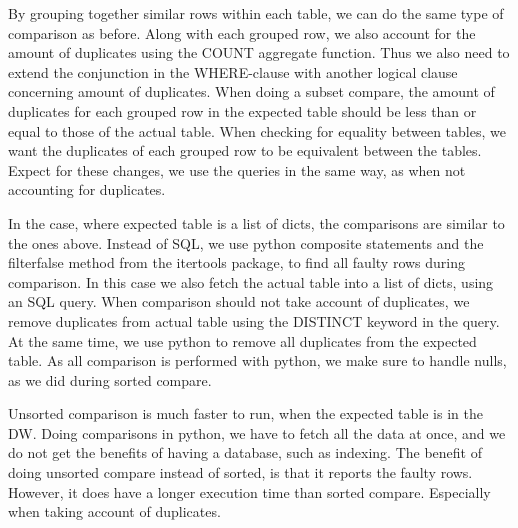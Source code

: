 
By grouping together similar rows within each table, we can do the same type of comparison as before. Along with each grouped row, we also account for the amount of duplicates using the COUNT aggregate function. Thus we also need to extend the conjunction in the WHERE-clause with another logical clause concerning amount of duplicates. When doing a subset compare, the amount of duplicates for each grouped row in the expected table should be less than or equal to those of the actual table. When checking for equality between tables, we want the duplicates of each grouped row to be equivalent between the tables. Expect for these changes, we use the queries in the same way, as when not accounting for duplicates.

In the case, where expected table is a list of dicts, the comparisons are similar to the ones above. Instead of SQL, we use python composite statements and the filterfalse method from the itertools package, to find all faulty rows during comparison. In this case we also fetch the actual table into a list of dicts, using an SQL query. When comparison should not take account of duplicates, we remove duplicates from actual table using the DISTINCT keyword in the query. At the same time, we use python to remove all duplicates from the expected table. As all comparison is performed with python, we make sure to handle nulls, as we did during sorted compare.

Unsorted comparison is much faster to run, when the expected table is in the DW. Doing comparisons in python, we have to fetch all the data at once, and we do not get the benefits of having a database, such as indexing. The benefit of doing unsorted compare instead of sorted, is that it reports the faulty rows. However, it does have a longer execution time than sorted compare. Especially when taking account of duplicates.